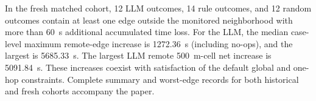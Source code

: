 In the fresh matched cohort, 12 LLM outcomes, 14 rule outcomes, and 12 random outcomes contain at least one edge outside the monitored neighborhood with more than 60~s additional accumulated time loss. For the LLM, the median case-level maximum remote-edge increase is 1272.36~s (including no-ops), and the largest is 5685.33~s. The largest LLM remote 500~m-cell net increase is 5091.84~s. These increases coexist with satisfaction of the default global and one-hop constraints. Complete summary and worst-edge records for both historical and fresh cohorts accompany the paper.
